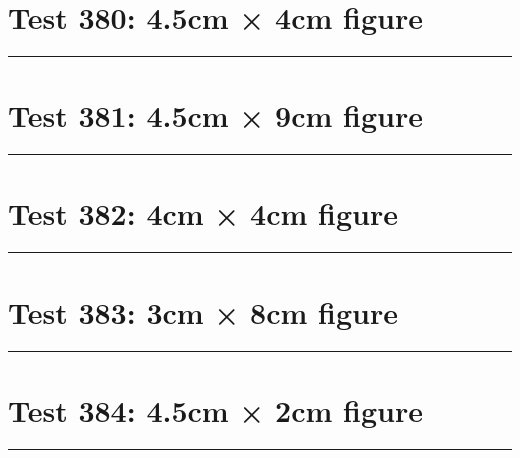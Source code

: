 \documentclass[a4paper,11pt]{article}
\begin{document}
\section*{Test 380: 4.5cm × 4cm figure}
\begin{swarmwrap}%
  \begin{minipage}[t]{4cm}
    \centering
    \rule{\linewidth}{4cm}
  \end{minipage}%
\end{swarmwrap}%
\swarmwrapnext
\lipsum[65]
\lipsum[66]
\lipsum[67]
\section*{Test 381: 4.5cm × 9cm figure}
\begin{swarmwrap}%
  \begin{minipage}[t]{4cm}
    \centering
    \rule{\linewidth}{9cm}
  \end{minipage}%
\end{swarmwrap}%
\swarmwrapnext
\lipsum[136]
\lipsum[137]
\lipsum[138]
\lipsum[139]
\lipsum[140]
\lipsum[141]
\section*{Test 382: 4cm × 4cm figure}
\begin{swarmwrap}%
  \begin{minipage}[t]{4cm}
    \centering
    \rule{\linewidth}{4cm}
  \end{minipage}%
\end{swarmwrap}%
\swarmwrapnext
\lipsum[97]
\lipsum[98]
\lipsum[99]
\lipsum[100]
\lipsum[101]
\section*{Test 383: 3cm × 8cm figure}
\begin{swarmwrap}%
  \begin{minipage}[t]{3cm}
    \centering
    \rule{\linewidth}{8cm}
  \end{minipage}%
\end{swarmwrap}%
\swarmwrapnext
\lipsum[88]
\lipsum[89]
\lipsum[90]
\lipsum[91]
\lipsum[92]
\lipsum[93]
\section*{Test 384: 4.5cm × 2cm figure}
\begin{swarmwrap}%
  \begin{minipage}[t]{4cm}
    \centering
    \rule{\linewidth}{2cm}
  \end{minipage}%
\end{swarmwrap}%
\swarmwrapnext
\lipsum[18]
\lipsum[19]
\lipsum[20]
\lipsum[21]
\lipsum[22]
\end{document}
